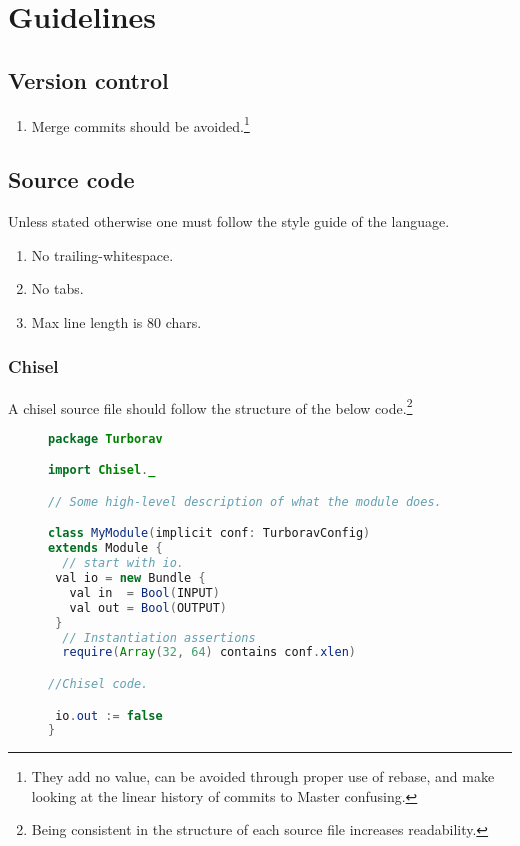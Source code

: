 \documentclass[12pt]{article}
\begin{document}
\section{Guidelines}
\subsection{Version control}
\begin{enumerate}
\item Merge commits should be avoided.\footnote
  {
    They add no value, can be avoided through proper use of rebase, and
    make looking at the linear history of commits to Master confusing.
  }
\end{enumerate}
\subsection{Source code}
Unless stated otherwise one must follow the style guide of the
language.
\begin{enumerate}
  \item No trailing-whitespace.
  \item No tabs.
  \item Max line length is 80 chars.
\end{enumerate}
\subsubsection{Chisel}

A chisel source file should follow the structure of the below code.\footnote
{
  Being consistent in the structure of each source file increases readability.
}
\begin{figure}
\begin{lstlisting}[language=Java, frame=single]
package Turborav

import Chisel._

// Some high-level description of what the module does.

class MyModule(implicit conf: TurboravConfig)
extends Module {
  // start with io.
 val io = new Bundle {
   val in  = Bool(INPUT)
   val out = Bool(OUTPUT)
 }
  // Instantiation assertions
  require(Array(32, 64) contains conf.xlen)

//Chisel code.

 io.out := false
}
\end{lstlisting}
\end{figure}
\end{document}
